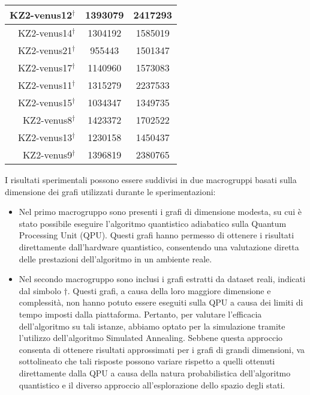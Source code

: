 \documentclass{article}
\begin{document}
\begin{table}
\begin{tabular}{|r|c|c|}
        KZ2-venus12$^\dagger$ & 1393079 & 2417293 \\ \hline
        KZ2-venus14$^\dagger$ & 1304192 & 1585019 \\ \hline
        KZ2-venus21$^\dagger$ & 955443 & 1501347 \\ \hline
        KZ2-venus17$^\dagger$ & 1140960 & 1573083 \\ \hline
        KZ2-venus11$^\dagger$ & 1315279 & 2237533 \\ \hline
        KZ2-venus15$^\dagger$ & 1034347 & 1349735 \\ \hline
        KZ2-venus8$^\dagger$ & 1423372 & 1702522 \\ \hline
        KZ2-venus13$^\dagger$ & 1230158 & 1450437 \\ \hline
        KZ2-venus9$^\dagger$ & 1396819 & 2380765 \\ \hline
    \end{tabular}
\end{table}

\pagebreak

I risultati sperimentali possono essere suddivisi in due macrogruppi basati sulla dimensione dei grafi utilizzati durante le sperimentazioni:

\begin{itemize}
    \item Nel primo macrogruppo sono presenti i grafi di dimensione modesta, su cui è stato possibile eseguire l'algoritmo quantistico adiabatico sulla Quantum Processing Unit (QPU). Questi grafi hanno permesso di ottenere i risultati direttamente dall'hardware quantistico, consentendo una valutazione diretta delle prestazioni dell'algoritmo in un ambiente reale.
    \item Nel secondo macrogruppo sono inclusi i grafi estratti da dataset reali, indicati dal simbolo $\dagger$. Questi grafi, a causa della loro maggiore dimensione e complessità, non hanno potuto essere eseguiti sulla QPU a causa dei limiti di tempo imposti dalla piattaforma. Pertanto, per valutare l'efficacia dell'algoritmo su tali istanze, abbiamo optato per la simulazione tramite l'utilizzo dell'algoritmo Simulated Annealing. Sebbene questa approccio consenta di ottenere risultati approssimati per i grafi di grandi dimensioni, va sottolineato che tali risposte possono variare rispetto a quelli ottenuti direttamente dalla QPU a causa della natura probabilistica dell'algoritmo quantistico e il diverso approccio all'esplorazione dello spazio degli stati.
\end{itemize}
\end{document}

